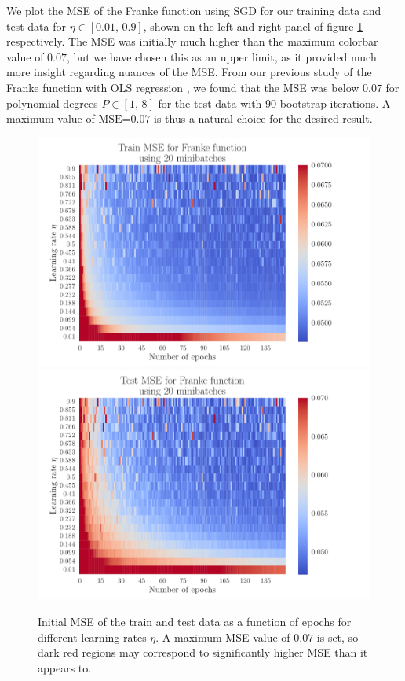 \documentclass[12pt]{extarticle}
\begin{document}
We plot the MSE of the Franke function using SGD for our training data and test data for $\eta\in[0.01,\,0.9]$, shown on the left and right panel of figure \ref{fig:SGD_Franke_epochs_eta_overfit} respectively. The MSE was initially much higher than the maximum colorbar value of $0.07$, but we have chosen this as an upper limit, as it provided much more insight regarding nuances of the MSE. From our previous study of the Franke function with OLS regression \cite{project1}, we found that the MSE was below $0.07$ for polynomial degrees $P\in[1,\,8]$ for the test data with 90 bootstrap iterations. A maximum value of $\text{MSE=0.07}$ is thus a natural choice for the desired result.

\begin{figure}[h!]
	\includegraphics[width=\linewidth]{SGD_Franke/reg_Franke__epochs_eta__Train_MSE__overfit_489047.pdf}
	\includegraphics[width=\linewidth]{SGD_Franke/reg_Franke__epochs_eta__Test_MSE__overfit_395885.pdf}
	\caption{Initial MSE of the train and test data as a function of epochs for different learning rates $\eta$. A maximum MSE value of $0.07$ is set, so dark red regions may correspond to significantly higher MSE than it appears to.}
	\label{fig:SGD_Franke_epochs_eta_overfit}
\end{figure}
\end{document}
